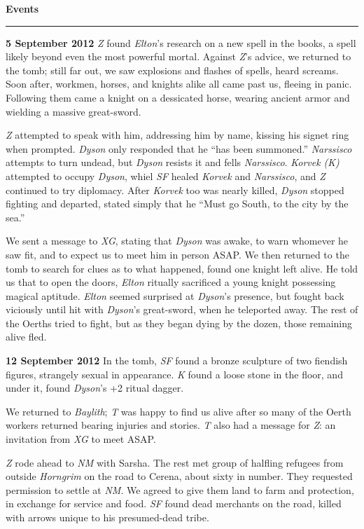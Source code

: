 \documentclass[letterpaper]{article}
\newcommand{\e}[1]{\emph{#1}}
\newcommand{\B}[1]{\textbf{#1}}
\newenvironment{notesection}[1]
{ {\huge \B{#1}}\hrule\vspace{0.5em}\begingroup\fontsize{9pt}{12pt}\selectfont}
{\endgroup}
\begin{document}
\begin{notesection}{Events}
\B{5 September 2012} \e{Z} found \e{Elton}'s research on a new spell in the books, a spell likely beyond even the most powerful mortal. Against \e{Z}'s advice, we returned to the tomb; still far out, we saw explosions and flashes of spells, heard screams. Soon after, workmen, horses, and knights alike all came past us, fleeing in panic. Following them came a knight on a dessicated horse, wearing ancient armor and wielding a massive great-sword.

\e{Z} attempted to speak with him, addressing him by name, kissing his signet ring when prompted.  \e{Dyson} only responded that he ``has been summoned.'' \e{Narssisco} attempts to turn undead, but \e{Dyson} resists it and fells \e{Narssisco}. \e{Korvek (K)} attempted to occupy \e{Dyson}, whiel \e{SF} healed \e{Korvek} and \e{Narssisco}, and \e{Z} continued to try diplomacy. After \e{Korvek} too was nearly killed, \e{Dyson} stopped fighting and departed, stated simply that he ``Must go South, to the city by the sea.''

We sent a message to \e{XG}, stating that \e{Dyson} was awake, to warn whomever he saw fit, and to expect us to meet him in person ASAP. We then returned to the tomb to search for clues as to what happened, found one knight left alive. He told us that to open the doors, \e{Elton} ritually sacrificed a young knight possessing magical aptitude. \e{Elton} seemed surprised at \e{Dyson}'s presence, but fought back viciously until hit with \e{Dyson}'s great-sword, when he teleported away. The rest of the Oerths tried to fight, but as they began dying by the dozen, those remaining alive fled.

\B{12 September 2012} In the tomb, \e{SF} found a bronze sculpture of two fiendish figures, strangely sexual in appearance. \e{K} found a loose stone in the floor, and under it, found \e{Dyson}'s +2 ritual dagger.

We returned to \e{Baylith}; \e{T} was happy to find us alive after so many of the Oerth workers returned bearing injuries and stories. \e{T} also had a message for \e{Z}: an invitation from \e{XG} to meet ASAP.

\e{Z} rode ahead to \e{NM} with Sarsha. The rest met group of halfling refugees from outside \e{Horngrim} on the road to Cerena, about sixty in number. They requested permission to settle at \e{NM}. We agreed to give them land to farm and protection, in exchange for service and food. \e{SF} found dead merchants on the road, killed with arrows unique to his presumed-dead tribe.


\end{notesection}
\end{document}
